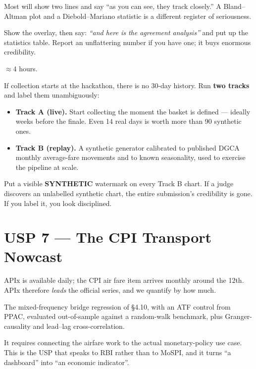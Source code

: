  Most will show two lines and say ``as you can see, they
track closely.'' A Bland--Altman plot and a Diebold--Mariano statistic is a different
register of seriousness.

 Show the overlay, then say: \emph{``and here is the agreement
analysis''} and put up the statistics table. Report an unflattering number if you have one;
it buys enormous credibility.

 $\approx$4 hours.

\begin{warnbox}
 If collection starts at the
hackathon, there is no 30-day history. Run \textbf{two tracks} and label them unambiguously:
\begin{itemize}
\item \textbf{Track A (live).} Start collecting the moment the basket is defined --- ideally
weeks before the finale. Even 14 real days is worth more than 90 synthetic ones.
\item \textbf{Track B (replay).} A synthetic generator calibrated to published DGCA monthly
average-fare movements and to known seasonality, used to exercise the pipeline at scale.
\end{itemize}
Put a visible \textbf{SYNTHETIC} watermark on every Track B chart. If a judge discovers an
unlabelled synthetic chart, the entire submission's credibility is gone. If you label it,
you look disciplined.
\end{warnbox}

\section{USP 7 --- The CPI Transport Nowcast}

\begin{uspbox}
 APIx is available daily; the CPI air fare item arrives monthly around the
12th. APIx therefore \emph{leads} the official series, and we quantify by how much.
\end{uspbox}

 The mixed-frequency bridge regression of \S4.10, with an ATF control from
PPAC, evaluated out-of-sample against a random-walk benchmark, plus Granger-causality and
lead--lag cross-correlation.

 It requires connecting the airfare work to the actual
monetary-policy use case. This is the USP that speaks to RBI rather than to MoSPI, and it
turns ``a dashboard'' into ``an economic indicator''.


